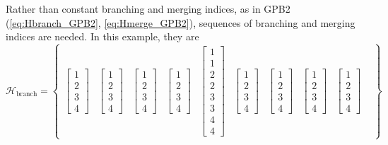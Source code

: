 {{Rather than constant branching and merging indices, as in GPB2 (\ref{eq:Hbranch_GPB2}, \ref{eq:Hmerge_GPB2}), sequences of branching and merging indices are needed. In this example, they are
\begin{equation} \label{eq:Hbranch_SFex2}
	\mathcal{H}_{\text{branch}} = \begin{Bmatrix}
		\begin{bmatrix} 1 \\ 2 \\ 3 \\ 4 \end{bmatrix} &
		\begin{bmatrix} 1 \\ 2 \\ 3 \\ 4 \end{bmatrix} &
		\begin{bmatrix} 1 \\ 2 \\ 3 \\ 4 \end{bmatrix} &
		\begin{bmatrix} 1 \\ 2 \\ 3 \\ 4 \end{bmatrix} &
		\begin{bmatrix} 1 \\ 1 \\ 2 \\ 2 \\ 3 \\ 3 \\ 4 \\ 4 \end{bmatrix} &
		\begin{bmatrix} 1 \\ 2 \\ 3 \\ 4 \end{bmatrix} &
		\begin{bmatrix} 1 \\ 2 \\ 3 \\ 4 \end{bmatrix} &
		\begin{bmatrix} 1 \\ 2 \\ 3 \\ 4 \end{bmatrix} &
		\begin{bmatrix} 1 \\ 2 \\ 3 \\ 4 \end{bmatrix} &

\end{Bmatrix}
\end{equation}}}
